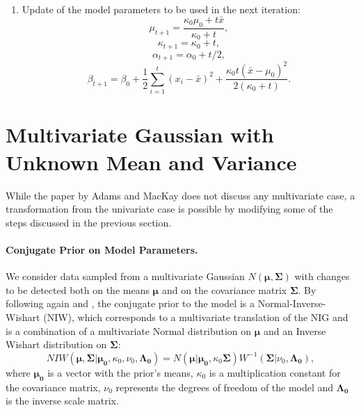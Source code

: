 \documentclass[11pt,twoside,a4paper]{report}
\begin{document}
\begin{enumerate}
\item Update of the model parameters to be used in the next iteration:
\begin{equation}\label{eq:fourth1}
\mu_{t+1} = \frac{\kappa_0\mu_0 + t\bar{x}}{\kappa_0 + t}, 
\end{equation} 
\begin{equation}
\kappa_{t+1} = \kappa_0 + t,
\end{equation}
\begin{equation}
\alpha_{t+1} = \alpha_0 + t/2,
\end{equation}
\begin{equation}\label{eq:fourth4}
\beta_{t+1} = \beta_0 + \frac{1}{2} \sum_{i=1}^{t} (x_i - \bar{x})^2 + \frac{\kappa_0t(\bar{x} - \mu_0)^2}{2(\kappa_0 + t)}.
\end{equation} 

\end{enumerate}


\section{Multivariate Gaussian with Unknown Mean and Variance} \label{sec:bayes}

While the paper by Adams and MacKay does not discuss any multivariate case, a transformation from the univariate case is possible by modifying some of the steps discussed in the previous section.

\paragraph{Conjugate Prior on Model Parameters.}

We consider data sampled from a multivariate Gaussian $N(\boldsymbol{\mu}, \boldsymbol{\Sigma})$ with changes to be detected both on the means $\boldsymbol{\mu}$ and on the covariance matrix $\boldsymbol{\Sigma}$. By following again  \cite{book1} and \cite{book2}, the conjugate prior to the model is a Normal-Inverse-Wishart (NIW), which corresponds to a multivariate translation of the NIG and is a combination of a multivariate Normal distribution on $\boldsymbol{\mu}$ and an Inverse Wishart distribution on $\boldsymbol{\Sigma}$:
\begin{equation}NIW(\boldsymbol{\mu}, \boldsymbol{\Sigma} | \boldsymbol{\mu_0}, \kappa_0, \nu_0, \boldsymbol{\Lambda_0}) = N(\boldsymbol{\mu} | \boldsymbol{\mu_0}, \kappa_0\boldsymbol{\Sigma})W^{-1}(\boldsymbol{\Sigma} | \nu_0, \boldsymbol{\Lambda_0}),
\end{equation}
where $\boldsymbol{\mu_0}$ is a vector with the prior's means, $\kappa_0$ is a multiplication constant for the covariance matrix, $\nu_0$ represents the degrees of freedom of the model and $\boldsymbol{\Lambda_0}$ is the inverse scale matrix.
\end{document}

